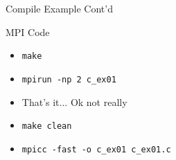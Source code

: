 \documentclass[handout]{beamer}
\begin{document}
\begin{frame}{Compile Example Cont'd}
 \begin{block}{MPI Code}
  \begin{itemize}
   \item \texttt{make}
   \item \texttt{mpirun -np 2 c\_ex01}
   \item <2-> That's it...  Ok not really
   \item <3-> \texttt{make clean}
   \item <3-> \texttt{mpicc -fast -o c\_ex01 c\_ex01.c}
  \end{itemize}
 \end{block}
\end{frame}
\end{document}
